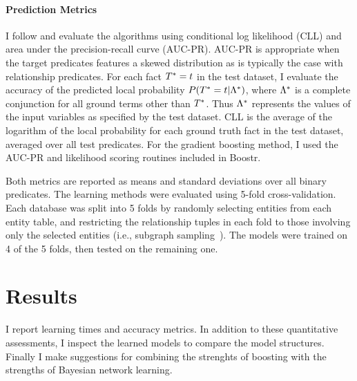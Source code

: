 \documentclass{sfuthesis}
\begin{document}
\paragraph{Prediction Metrics}
I  follow \cite{Khot2011} and evaluate the algorithms using conditional log likelihood (CLL) and area under the precision-recall curve (AUC-PR). AUC-PR is appropriate when the target predicates features a skewed distribution as is typically the case with relationship predicates. %
For each fact $T^{*}\hspace{0.0ex} = t$ in the test dataset, I  evaluate the accuracy of the predicted local probability $P(T^{*}\hspace{0.0ex} = t | \Lambda^{*}\hspace{0.0ex})$, where $\Lambda^{*}\hspace{0.0ex}$ is a complete conjunction for all ground terms other than $T^{*}\hspace{0.0ex}$. Thus $\Lambda^{*}\hspace{0.0ex}$ represents the values of the input variables as specified by the test dataset.
CLL is the average of the logarithm of the local probability for each ground truth fact in the test dataset, averaged over all test predicates. For the gradient boosting method, I  used the AUC-PR and likelihood scoring routines included in Boostr.

Both metrics are reported as means and standard deviations over all binary predicates. The learning methods were evaluated using 5-fold cross-validation. Each database was split into 5 folds by randomly selecting entities from each entity table, and restricting the relationship tuples in each fold to those involving only the selected entities  (i.e., subgraph sampling~\cite{Schulte2012}). The models were trained on 4 of the 5 folds, then tested on the remaining one. 

\section{Results} 
%


I  report learning times and accuracy metrics. In addition to these quantitative assessments, I  inspect the learned models to compare the model structures. Finally I  make suggestions for combining the strenghts of boosting with the strengths of Bayesian network learning. 
\end{document}
